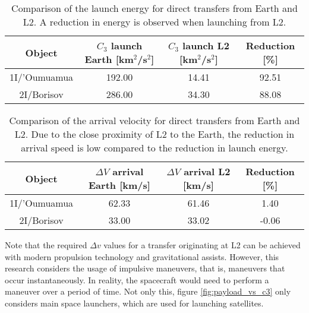 \vspace{1cm}
\begin{table}[H]
  \centering
  \begin{tabular}{|c|c|c|c|}
    \hline
    Object       & $C_3$ launch Earth [km$^2$/s$^2$] & $C_3$ launch L2 [km$^2$/s$^2$] & Reduction [\%] \\
    \hline
    1I/'Oumuamua & 192.00                            & 14.41                          & 92.51          \\
    \hline
    2I/Borisov   & 286.00                            & 34.30                          & 88.08          \\
    \hline
  \end{tabular}
  \caption[Comparison of the launch energy for direct transfers from Earth and
    L2.]{Comparison of the launch energy for direct transfers from Earth and L2. A reduction in energy is observed when launching from L2.}
  \label{tab:summary-results-c3-launch}
\end{table}

\vspace{1cm}
\begin{table}[H]
  \centering
  \begin{tabular}{|c|c|c|c|}
    \hline
    Object       & $\Delta V$ arrival Earth [km/s] & $\Delta V$ arrival L2 [km/s] & Reduction [\%] \\
    \hline
    1I/'Oumuamua & 62.33                           & 61.46                        & 1.40           \\
    \hline
    2I/Borisov   & 33.00                           & 33.02                        & -0.06          \\
    \hline
  \end{tabular}
  \caption[Comparison of the arrival velocity for direct transfers from Earth and
    L2.]{Comparison of the arrival velocity for direct transfers from Earth and
    L2. Due to the close proximity of L2 to the Earth, the reduction in
    arrival speed is low compared to the reduction in launch energy.}
  \label{tab:summary-results-arrival-v}
\end{table}




Note that the required $\Delta v$ values for a transfer originating at L2 can be
achieved with modern propulsion technology and gravitational assists. However,
this research considers the usage of impulsive maneuvers, that is, maneuvers
that occur instantaneously. In reality, the spacecraft would need to perform
a maneuver over a period of time. Not only this, figure \ref{fig:payload_vs_c3}
only considers main space launchers, which are used for launching satellites.

